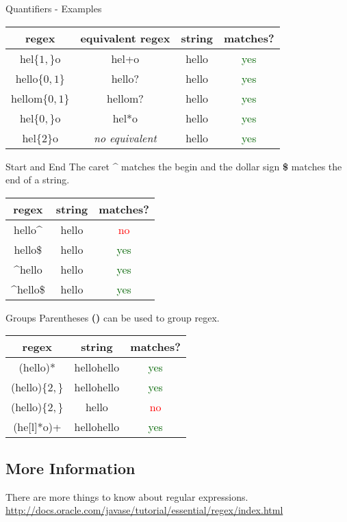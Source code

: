 \begin{frame}{Quantifiers - Examples}
	\begin{tabular}{ c c c | c }
		regex & equivalent regex & string & matches? \\
		\hline
		hel$\lbrace 1,\rbrace$o & hel+o &
		hello & \textcolor{darkgreen}{yes} \\
		hello$\lbrace 0,1\rbrace$ & hello? & 
		hello & \textcolor{darkgreen}{yes} \\
		hellom$\lbrace 0,1\rbrace$ & hellom? & 
		hello & \textcolor{darkgreen}{yes} \\
		hel$\lbrace 0,\rbrace$o & hel*o & 
		hello & \textcolor{darkgreen}{yes} \\
		hel$\lbrace 2\rbrace$o & \emph{no equivalent} & 
		hello & \textcolor{darkgreen}{yes}
	\end{tabular}
\end{frame}

\begin{frame}{Start and End}
	The caret \textbf{\^{}} matches the begin and the dollar sign \textbf{\${}} matches the end of a string.
	\vfill
	\begin{tabular}{ c c | c }
		regex & string & matches? \\
		\hline
		hello\^{}     & hello & \textcolor{red}{no} \\
		hello\${}     & hello & \textcolor{darkgreen}{yes} \\
		\^{}hello     & hello & \textcolor{darkgreen}{yes} \\
		\^{}hello\${} & hello & \textcolor{darkgreen}{yes} 
	\end{tabular}
\end{frame}

\begin{frame}{Groups}
	Parentheses \textbf{()} can be used to group regex.
	\vfill
	\begin{tabular}{ c c | c }
		regex & string & matches? \\
		\hline
		(hello)*                   & hellohello & \textcolor{darkgreen}{yes} \\
		(hello)$\lbrace 2,\rbrace$ & hellohello & \textcolor{darkgreen}{yes} \\
		(hello)$\lbrace 2,\rbrace$ & hello      & \textcolor{red}{no} \\
		(he[l]*o)+                 & hellohello & \textcolor{darkgreen}{yes} 
	\end{tabular}
\end{frame}

\subsection{More Information}
\begin{frame}{}
	There are more things to know about regular expressions.
	\vfill
	\url{http://docs.oracle.com/javase/tutorial/essential/regex/index.html}
\end{frame}

